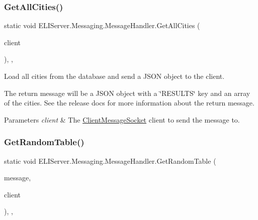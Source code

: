 \subsubsection{\texorpdfstring{Get\+All\+Cities()}{GetAllCities()}}
{\footnotesize\ttfamily static void E\+L\+I\+Server.\+Messaging.\+Message\+Handler.\+Get\+All\+Cities (\begin{DoxyParamCaption}\item[{\hyperlink{class_e_l_i_server_1_1_messaging_1_1_client_message_socket}{Client\+Message\+Socket}}]{client }\end{DoxyParamCaption})\hspace{0.3cm}{\ttfamily [inline]}, {\ttfamily [static]}, {\ttfamily [private]}}





Load all cities from the database and send a J\+S\+ON object to the client.

The return message will be a J\+S\+ON object with a \char`\"{}\+R\+E\+S\+U\+L\+T\+S\char`\"{} key and an array of the cities. See the release docs for more information about the return message. 


\begin{DoxyParams}{Parameters}
{\em client} & The \hyperlink{class_e_l_i_server_1_1_messaging_1_1_client_message_socket}{Client\+Message\+Socket} client to send the message to.\\
\hline
\end{DoxyParams}
\mbox{\label{class_e_l_i_server_1_1_messaging_1_1_message_handler_a45ed426f6fdc21493aa8727d44a1b502}} 
\subsubsection{\texorpdfstring{Get\+Random\+Table()}{GetRandomTable()}}
{\footnotesize\ttfamily static void E\+L\+I\+Server.\+Messaging.\+Message\+Handler.\+Get\+Random\+Table (\begin{DoxyParamCaption}\item[{dynamic}]{message,  }\item[{\hyperlink{class_e_l_i_server_1_1_messaging_1_1_client_message_socket}{Client\+Message\+Socket}}]{client }\end{DoxyParamCaption})\hspace{0.3cm}{\ttfamily [inline]}, {\ttfamily [static]}, {\ttfamily [private]}}





